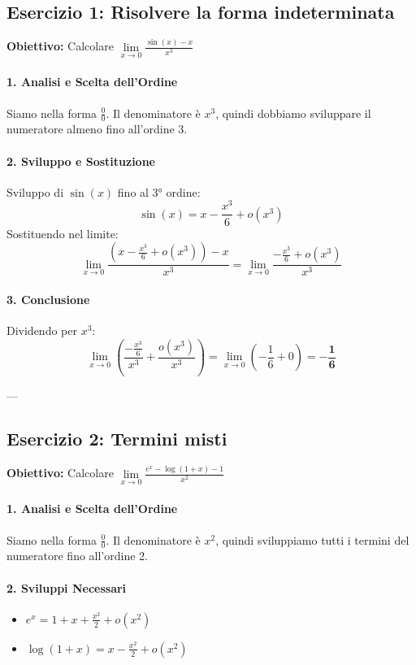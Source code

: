 \subsection{Esercizio 1: Risolvere la forma indeterminata}
\begin{example}
\textbf{Obiettivo:} Calcolare $\lim\limits_{x\to 0}\frac{\sin(x) - x}{x^3}$
\end{example}

\paragraph{1. Analisi e Scelta dell'Ordine}
Siamo nella forma $\frac{0}{0}$. Il denominatore è $x^3$, quindi dobbiamo sviluppare il numeratore almeno fino all'ordine 3.

\paragraph{2. Sviluppo e Sostituzione}
Sviluppo di $\sin(x)$ fino al 3° ordine:
$$ \sin(x) = x - \frac{x^3}{6} + o(x^3) $$
Sostituendo nel limite:
$$ \lim_{x\to 0}\frac{\left(x - \frac{x^3}{6} + o(x^3)\right) - x}{x^3} = \lim_{x\to 0}\frac{-\frac{x^3}{6} + o(x^3)}{x^3} $$

\paragraph{3. Conclusione}
Dividendo per $x^3$:
$$ \lim_{x\to 0} \left( \frac{-\frac{x^3}{6}}{x^3} + \frac{o(x^3)}{x^3} \right) = \lim_{x\to 0} \left( -\frac{1}{6} + 0 \right) = \mathbf{-\frac{1}{6}} $$

---
\subsection{Esercizio 2: Termini misti}
\begin{example}
\textbf{Obiettivo:} Calcolare $\lim\limits_{x\to 0}\frac{e^x - \log(1+x) - 1}{x^2}$
\end{example}

\paragraph{1. Analisi e Scelta dell'Ordine}
Siamo nella forma $\frac{0}{0}$. Il denominatore è $x^2$, quindi sviluppiamo tutti i termini del numeratore fino all'ordine 2.

\paragraph{2. Sviluppi Necessari}
\begin{itemize}
    \item $e^x = 1 + x + \frac{x^2}{2} + o(x^2)$
    \item $\log(1+x) = x - \frac{x^2}{2} + o(x^2)$
\end{itemize}

